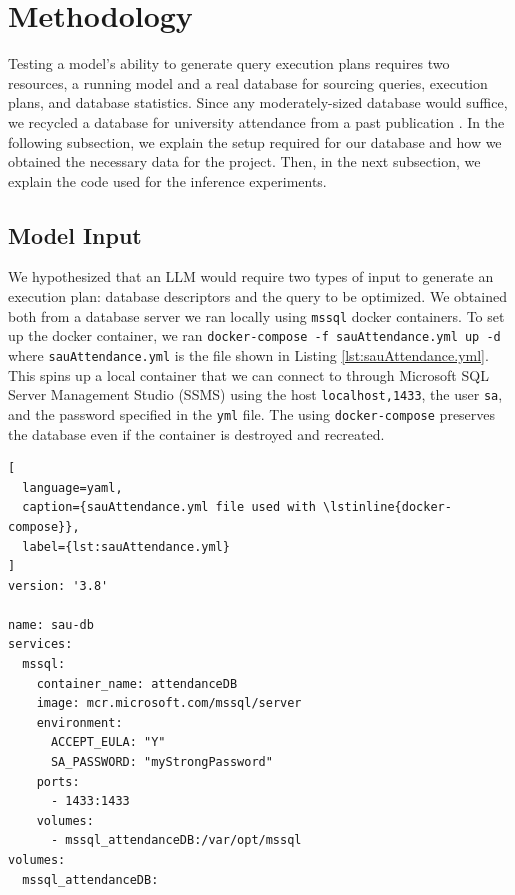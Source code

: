 \section{Methodology}
Testing a model's ability to generate query execution plans requires two resources, a running model and a real database for sourcing queries, execution plans, and database statistics. Since any moderately-sized database would suffice, we recycled a database for university attendance from a past publication \cite{hybl2023}. In the following subsection, we explain the setup required for our database and how we obtained the necessary data for the project. Then, in the next subsection, we explain the code used for the inference experiments.

\subsection{Model Input}
We hypothesized that an LLM would require two types of input to generate an execution plan: database descriptors and the query to be optimized. We obtained both from a database server we ran locally using \lstinline{mssql} docker containers. To set up the docker container, we ran \lstinline{docker-compose -f sauAttendance.yml up -d} where \lstinline{sauAttendance.yml} is the file shown in Listing \ref{lst:sauAttendance.yml}. This spins up a local container that we can connect to through Microsoft SQL Server Management Studio (SSMS) using the host \lstinline{localhost,1433}, the user \lstinline{sa}, and the password specified in the \lstinline{yml} file. The using \lstinline{docker-compose} preserves the database even if the container is destroyed and recreated.

\begin{lstlisting}[
  language=yaml,
  caption={sauAttendance.yml file used with \lstinline{docker-compose}},
  label={lst:sauAttendance.yml}
]
version: '3.8'

name: sau-db
services:
  mssql:
    container_name: attendanceDB
    image: mcr.microsoft.com/mssql/server
    environment:
      ACCEPT_EULA: "Y"
      SA_PASSWORD: "myStrongPassword"
    ports:
      - 1433:1433
    volumes:
      - mssql_attendanceDB:/var/opt/mssql
volumes:
  mssql_attendanceDB:
\end{lstlisting}

